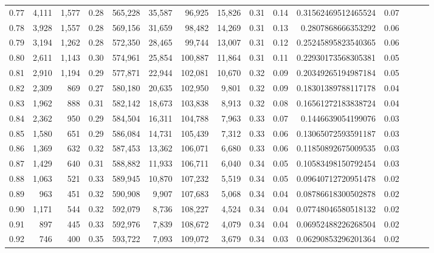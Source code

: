 \begin{tabular}{rrrrrrrrrrrrrrr}
0.77 &   4,111 &  1,577 &  0.28 &  565,228 &   35,587 &   96,925 &   15,826 &  0.31 &  0.14 &   0.31562469512465524 &      0.07 \\
0.78 &   3,928 &  1,557 &  0.28 &  569,156 &   31,659 &   98,482 &   14,269 &  0.31 &  0.13 &    0.2807868666353292 &      0.06 \\
0.79 &   3,194 &  1,262 &  0.28 &  572,350 &   28,465 &   99,744 &   13,007 &  0.31 &  0.12 &   0.25245895823540365 &      0.06 \\
0.80 &   2,611 &  1,143 &  0.30 &  574,961 &   25,854 &  100,887 &   11,864 &  0.31 &  0.11 &   0.22930173568305381 &      0.05 \\
0.81 &   2,910 &  1,194 &  0.29 &  577,871 &   22,944 &  102,081 &   10,670 &  0.32 &  0.09 &   0.20349265194987184 &      0.05 \\
0.82 &   2,309 &    869 &  0.27 &  580,180 &   20,635 &  102,950 &    9,801 &  0.32 &  0.09 &   0.18301389788117178 &      0.04 \\
0.83 &   1,962 &    888 &  0.31 &  582,142 &   18,673 &  103,838 &    8,913 &  0.32 &  0.08 &   0.16561272183838724 &      0.04 \\
0.84 &   2,362 &    950 &  0.29 &  584,504 &   16,311 &  104,788 &    7,963 &  0.33 &  0.07 &    0.1446639054199076 &      0.03 \\
0.85 &   1,580 &    651 &  0.29 &  586,084 &   14,731 &  105,439 &    7,312 &  0.33 &  0.06 &   0.13065072593591187 &      0.03 \\
0.86 &   1,369 &    632 &  0.32 &  587,453 &   13,362 &  106,071 &    6,680 &  0.33 &  0.06 &   0.11850892675009535 &      0.03 \\
0.87 &   1,429 &    640 &  0.31 &  588,882 &   11,933 &  106,711 &    6,040 &  0.34 &  0.05 &   0.10583498150792454 &      0.03 \\
0.88 &   1,063 &    521 &  0.33 &  589,945 &   10,870 &  107,232 &    5,519 &  0.34 &  0.05 &   0.09640712720951478 &      0.02 \\
0.89 &     963 &    451 &  0.32 &  590,908 &    9,907 &  107,683 &    5,068 &  0.34 &  0.04 &   0.08786618300502878 &      0.02 \\
0.90 &   1,171 &    544 &  0.32 &  592,079 &    8,736 &  108,227 &    4,524 &  0.34 &  0.04 &   0.07748046580518132 &      0.02 \\
0.91 &     897 &    445 &  0.33 &  592,976 &    7,839 &  108,672 &    4,079 &  0.34 &  0.04 &   0.06952488226268504 &      0.02 \\
0.92 &     746 &    400 &  0.35 &  593,722 &    7,093 &  109,072 &    3,679 &  0.34 &  0.03 &   0.06290853296201364 &      0.02 \\

\end{tabular}
